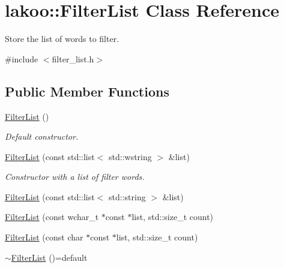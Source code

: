 \hypertarget{classlakoo_1_1_filter_list}{}\section{lakoo\+:\+:Filter\+List Class Reference}
\label{classlakoo_1_1_filter_list}


Store the list of words to filter.  




{\ttfamily \#include $<$filter\+\_\+list.\+h$>$}

\subsection*{Public Member Functions}
\begin{DoxyCompactItemize}
\item 
\mbox{\label{classlakoo_1_1_filter_list_a6740dd4bfc659afb2791c0e5fcc3fdf2}} 
\hyperlink{classlakoo_1_1_filter_list_a6740dd4bfc659afb2791c0e5fcc3fdf2}{Filter\+List} ()
\begin{DoxyCompactList}\small\item\em Default constructor. \end{DoxyCompactList}\item 
\hyperlink{classlakoo_1_1_filter_list_a664a64a5eab384a18d454348314ec9e8}{Filter\+List} (const std\+::list$<$ std\+::wstring $>$ \&list)
\begin{DoxyCompactList}\small\item\em Constructor with a list of filter words. \end{DoxyCompactList}\item 
\hyperlink{classlakoo_1_1_filter_list_aa1f55e47a7724168e3b5bce0dfdaa291}{Filter\+List} (const std\+::list$<$ std\+::string $>$ \&list)
\item 
\hyperlink{classlakoo_1_1_filter_list_a18339c4c41745f86651e0083794f8879}{Filter\+List} (const wchar\+\_\+t $\ast$const $\ast$list, std\+::size\+\_\+t count)
\item 
\hyperlink{classlakoo_1_1_filter_list_a6e3e186a19a2950ddd52cb2beddc09f7}{Filter\+List} (const char $\ast$const $\ast$list, std\+::size\+\_\+t count)
\item 
\mbox{\label{classlakoo_1_1_filter_list_a86eec96a1833204a59bff71ebd32949d}} 
\hyperlink{classlakoo_1_1_filter_list_a86eec96a1833204a59bff71ebd32949d}{$\sim$\+Filter\+List} ()=default

\end{DoxyCompactItemize}

